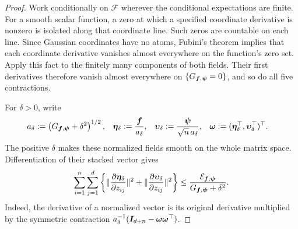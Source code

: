 \documentclass{article}
\theoremstyle{plain} %
\theoremstyle{definition} %
\theoremstyle{definition} %
\begin{document}
\begin{proof}
Work conditionally on $\mathcal F$ wherever the conditional expectations are
finite. For a smooth scalar function, a zero at which a specified coordinate
derivative is nonzero is isolated along that coordinate line. Such zeros are
countable on each line. Since Gaussian coordinates have no atoms, Fubini's
theorem implies that each coordinate derivative vanishes almost everywhere
on the function's zero set. Apply this fact to the finitely many components
of both fields. Their first derivatives therefore vanish almost everywhere
on $\{G_{\boldsymbol{f},\boldsymbol\psi}=0\}$, and so do all five contractions.

For $\delta>0$, write
\begin{align*}
    a_\delta&:=\left(G_{\boldsymbol{f},\boldsymbol\psi}+\delta^2\right)^{1/2},
    & \boldsymbol\eta_\delta&:=\frac{\boldsymbol{f}}{a_\delta},
    & \boldsymbol\upsilon_\delta
       &:=\frac{\boldsymbol\psi}{\sqrt n\,a_\delta},
    & \boldsymbol\omega&:=
       (\boldsymbol\eta_\delta^\top,
        \boldsymbol\upsilon_\delta^\top)^\top.
\end{align*}
The positive $\delta$ makes these normalized fields smooth on the whole
matrix space.  Differentiation of their stacked vector gives
\begin{align*}
    \sum_{i=1}^n\sum_{j=1}^d\left\{
       \lVert\pdv{\boldsymbol\eta_\delta}{z_{ij}}\rVert^2
       +\lVert\pdv{\boldsymbol\upsilon_\delta}{z_{ij}}\rVert^2
    \right\}
    \leq
    \frac{{\mathcal E}_{\boldsymbol{f},\boldsymbol\psi}}
         {G_{\boldsymbol{f},\boldsymbol\psi}+\delta^2}.
\end{align*}
Indeed, the derivative of a normalized vector is its original derivative
multiplied by the symmetric contraction
$a_\delta^{-1}(\boldsymbol{I}_{d+n}-\boldsymbol\omega\boldsymbol\omega^\top)$.


\end{proof}
\end{document}

